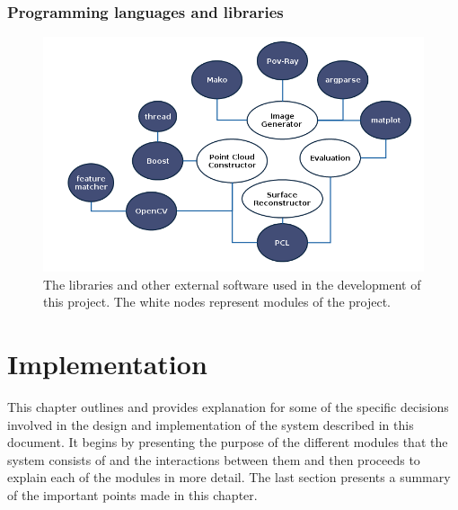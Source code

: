 \documentclass[12pt,a4paper,twoside,openright]{report}
\begin{document}
\subsection{Programming languages and libraries}
\begin{figure}
\centerline{\includegraphics[scale=0.8]{figs/libraries.png}}
\caption{The libraries and other external software used in the development of this project. The white nodes represent modules of the project.}
\end{figure}

\chapter{Implementation}
This chapter outlines and provides explanation for some of the specific decisions involved in the design and implementation of the system described in this document. It begins by presenting the purpose of the different modules that the system consists of and the interactions between them and then proceeds to explain each of the modules in more detail. The last section presents a summary of the important points made in this chapter.
\end{document}
